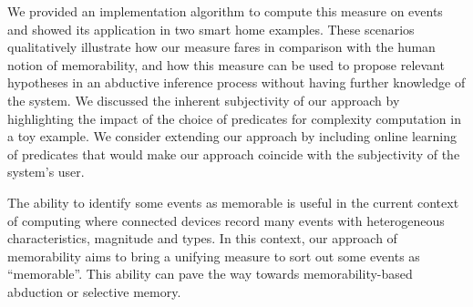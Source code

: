 \documentclass[entropy,article,submit,moreauthors,pdftex]{Definitions/mdpi}
\begin{document}
We provided an implementation algorithm to compute this measure on events and showed its application in two smart home examples. These scenarios qualitatively illustrate how our measure fares in comparison with the human notion of memorability, and how this measure can be used to propose relevant hypotheses in an abductive inference process without having further knowledge of the system. We discussed the inherent subjectivity of our approach by highlighting the impact of the choice of predicates for complexity computation in a toy example. We consider extending our approach by including online learning of predicates that would make our approach coincide with the subjectivity of the system's user.

The ability to identify some events as memorable is useful in the current context of computing where connected devices record many events with heterogeneous characteristics, magnitude and types. In this context, our approach of memorability aims to bring a unifying measure to sort out some events as ``memorable''. This ability can pave the way towards memorability-based abduction or selective memory.


\vspace{6pt}






\end{document}
